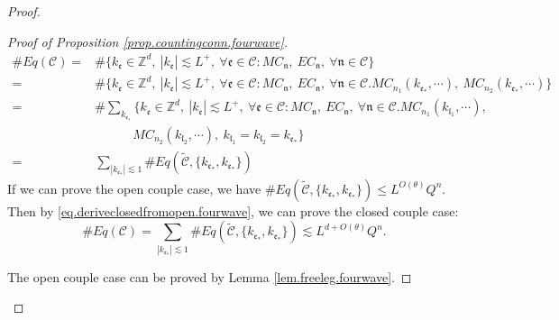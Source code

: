 \begin{proof}
\begin{proof}[Proof of Proposition \ref{prop.countingconn.fourwave}]
    \begin{equation}\label{eq.deriveclosedfromopen.fourwave}
    \begin{split}
    \#Eq(\mathcal{C})=&\#\{k_{\mathfrak{e}}\in \mathbb{Z}^d,\ |k_{\mathfrak{e}}| \lesssim L^+,\ \forall \mathfrak{e}\in \mathcal{C}:MC_{\mathfrak{n}},\  EC_{\mathfrak{n}},\ \forall \mathfrak{n}\in \mathcal{C}\} 
    \\
    =&\#\{k_{\mathfrak{e}}\in \mathbb{Z}^d,\ |k_{\mathfrak{e}}| \lesssim L^+,\ \forall \mathfrak{e}\in \mathcal{C}:MC_{\mathfrak{n}},\  EC_{\mathfrak{n}},\ \forall \mathfrak{n}\in \mathcal{C}. MC_{n_1}(k_{\mathfrak{e}_*},\cdots),\ MC_{n_2}(k_{\mathfrak{e}_*},\cdots)\} 
    \\
    =&\#\sum_{k_{\mathfrak{e}_*}}\{k_{\mathfrak{e}}\in \mathbb{Z}^d,\ |k_{\mathfrak{e}}| \lesssim L^+,\ \forall \mathfrak{e}\in \mathcal{C}:MC_{\mathfrak{n}},\  EC_{\mathfrak{n}},\ \forall \mathfrak{n}\in \mathcal{C}. MC_{n_1}(k_{\mathfrak{l}_1},\cdots),
    \\
    &\qquad\quad MC_{n_2}(k_{\mathfrak{l}_2},\cdots),\ k_{\mathfrak{l}_1}=k_{\mathfrak{l}_2}=k_{\mathfrak{e}_*}\} 
    \\
    =&\sum_{|k_{\mathfrak{e}_*}|\lesssim 1} \#Eq(\widetilde{\mathcal{C}},\{k_{\mathfrak{e}_*},k_{\mathfrak{e}_*}\})
    \end{split}
    \end{equation}
    If we can prove the open couple case, we have $\#Eq(\widetilde{\mathcal{C}},\{k_{\mathfrak{e}_*},k_{\mathfrak{e}_*}\})\le L^{O(\theta)} Q^{n}$. Then by \eqref{eq.deriveclosedfromopen.fourwave}, we can prove the closed couple case: 
    \begin{equation}
     \#Eq(\mathcal{C})=\sum_{|k_{\mathfrak{e}_*}|\lesssim 1} \#Eq(\widetilde{\mathcal{C}},\{k_{\mathfrak{e}_*},k_{\mathfrak{e}_*}\})\lesssim L^{d+O(\theta)} Q^{n}.
    \end{equation}
    
    The open couple case can be proved by Lemma \ref{lem.freeleg.fourwave}.
    

\end{proof}
\end{proof}
